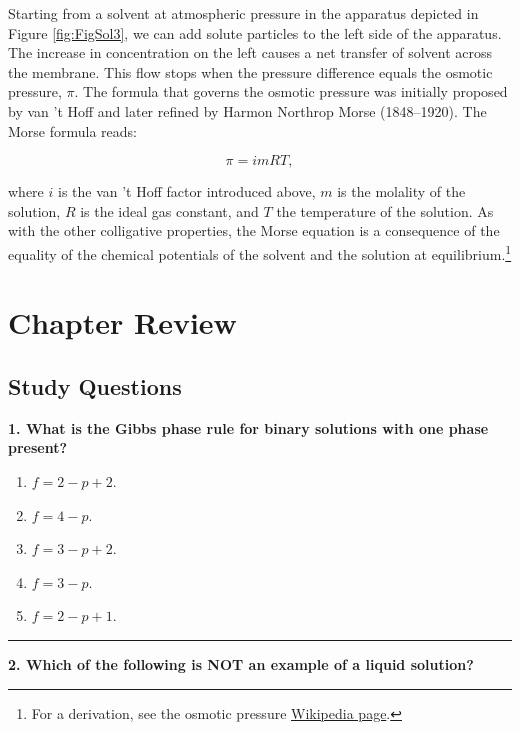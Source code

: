 \documentclass[
  9pt,
]{extbook}
\providecommand{\tightlist}{%
  \setlength{\itemsep}{0pt}\setlength{\parskip}{0pt}}
\theoremstyle{definition}
\theoremstyle{definition}
\theoremstyle{definition}
\theoremstyle{definition}
\theoremstyle{remark}
\begin{document}
Starting from a solvent at atmospheric pressure in the apparatus depicted in Figure \ref{fig:FigSol3}, we can add solute particles to the left side of the apparatus. The increase in concentration on the left causes a net transfer of solvent across the membrane. This flow stops when the pressure difference equals the osmotic pressure, \(\pi\). The formula that governs the osmotic pressure was initially proposed by van 't Hoff and later refined by Harmon Northrop Morse (1848--1920). The Morse formula reads:

\begin{equation}
\pi = imRT,
\label{eq:coll8}
\end{equation}

where \(i\) is the van 't Hoff factor introduced above, \(m\) is the molality of the solution, \(R\) is the ideal gas constant, and \(T\) the temperature of the solution. As with the other colligative properties, the Morse equation is a consequence of the equality of the chemical potentials of the solvent and the solution at equilibrium.\footnote{For a derivation, see the osmotic pressure \href{https://en.wikipedia.org/wiki/Osmotic_pressure}{Wikipedia page}.}

\section{Chapter Review}\label{rev13}

\subsection{Study Questions}\label{quest13}

\textbf{1. What is the Gibbs phase rule for binary solutions with one phase present?}

\begin{enumerate}
\def\labelenumi{\alph{enumi}.}
\tightlist
\item
  \(f = 2 - p + 2\).
\item
  \(f = 4 - p\).
\item
  \(f = 3 - p + 2\).
\item
  \(f = 3 - p\).
\item
  \(f = 2 - p + 1\).
\end{enumerate}

\begin{center}\rule{0.5\linewidth}{0.5pt}\end{center}

\textbf{2. Which of the following is NOT an example of a liquid solution?}
\end{document}
